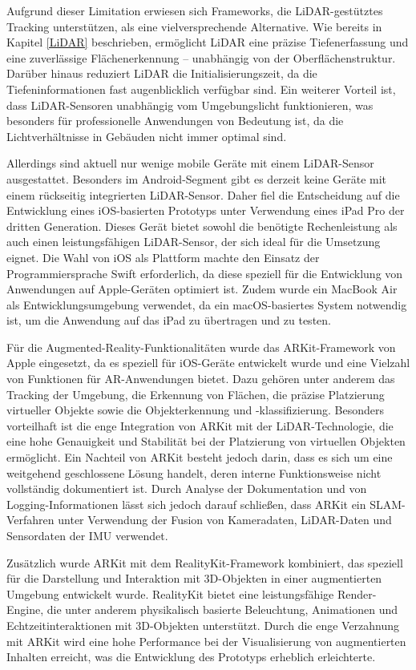 Aufgrund dieser Limitation erwiesen sich Frameworks, die LiDAR-gestütztes Tracking unterstützen, als eine vielversprechende Alternative. Wie bereits in Kapitel \ref{LiDAR} beschrieben, ermöglicht LiDAR eine präzise Tiefenerfassung und eine zuverlässige Flächenerkennung – unabhängig von der Oberflächenstruktur. Darüber hinaus reduziert LiDAR die Initialisierungszeit, da die Tiefeninformationen fast augenblicklich verfügbar sind. Ein weiterer Vorteil ist, dass LiDAR-Sensoren unabhängig vom Umgebungslicht funktionieren, was besonders für professionelle Anwendungen von Bedeutung ist, da die Lichtverhältnisse in Gebäuden nicht immer optimal sind.

Allerdings sind aktuell nur wenige mobile Geräte mit einem LiDAR-Sensor ausgestattet. Besonders im Android-Segment gibt es derzeit keine Geräte mit einem rückseitig integrierten LiDAR-Sensor. Daher fiel die Entscheidung auf die Entwicklung eines iOS-basierten Prototyps unter Verwendung eines iPad Pro der dritten Generation. Dieses Gerät bietet sowohl die benötigte Rechenleistung als auch einen leistungsfähigen LiDAR-Sensor, der sich ideal für die Umsetzung eignet. Die Wahl von iOS als Plattform machte den Einsatz der Programmiersprache Swift erforderlich, da diese speziell für die Entwicklung von Anwendungen auf Apple-Geräten optimiert ist. Zudem wurde ein MacBook Air als Entwicklungsumgebung verwendet, da ein macOS-basiertes System notwendig ist, um die Anwendung auf das iPad zu übertragen und zu testen.

Für die Augmented-Reality-Funktionalitäten wurde das ARKit-Framework von Apple eingesetzt, da es speziell für iOS-Geräte entwickelt wurde und eine Vielzahl von Funktionen für AR-Anwendungen bietet. Dazu gehören unter anderem das Tracking der Umgebung, die Erkennung von Flächen, die präzise Platzierung virtueller Objekte sowie die Objekterkennung und -klassifizierung. Besonders vorteilhaft ist die enge Integration von ARKit mit der LiDAR-Technologie, die eine hohe Genauigkeit und Stabilität bei der Platzierung von virtuellen Objekten ermöglicht. Ein Nachteil von ARKit besteht jedoch darin, dass es sich um eine weitgehend geschlossene Lösung handelt, deren interne Funktionsweise nicht vollständig dokumentiert ist. Durch Analyse der Dokumentation und von Logging-Informationen lässt sich jedoch darauf schließen, dass ARKit ein SLAM-Verfahren unter Verwendung der Fusion von Kameradaten, LiDAR-Daten und Sensordaten der IMU verwendet.

Zusätzlich wurde ARKit mit dem RealityKit-Framework kombiniert, das speziell für die Darstellung und Interaktion mit 3D-Objekten in einer augmentierten Umgebung entwickelt wurde. RealityKit bietet eine leistungsfähige Render-Engine, die unter anderem physikalisch basierte Beleuchtung, Animationen und Echtzeitinteraktionen mit 3D-Objekten unterstützt. Durch die enge Verzahnung mit ARKit wird eine hohe Performance bei der Visualisierung von augmentierten Inhalten erreicht, was die Entwicklung des Prototyps erheblich erleichterte.

